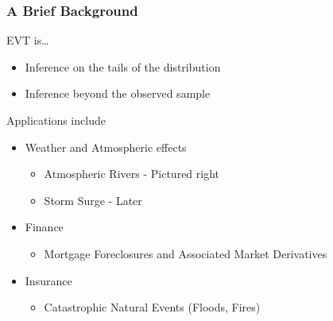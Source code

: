 \documentclass[aspectratio=169,10pt]{beamer}
\begin{document}
\begin{frame}
    \frametitle{A Brief Background}
    \begin{minipage}{0.64\textwidth}
    EVT is\ldots
    \begin{itemize}
        \item Inference on the tails of the distribution
        \item Inference beyond the observed sample
    \end{itemize}
    Applications include
    \begin{itemize}
        \item Weather and Atmospheric effects
        \begin{itemize}
            \item Atmospheric Rivers - Pictured right
            \item Storm Surge - Later
        \end{itemize}
        \item Finance
        \begin{itemize}
            \item Mortgage Foreclosures and Associated Market Derivatives
        \end{itemize}
        \item Insurance
        \begin{itemize}
            \item Catastrophic Natural Events (Floods, Fires)
        \end{itemize}
    \end{itemize}
    \end{minipage} %
    \begin{minipage}{.35\textwidth}
    \centering

\end{minipage}
\end{frame}
\end{document}
